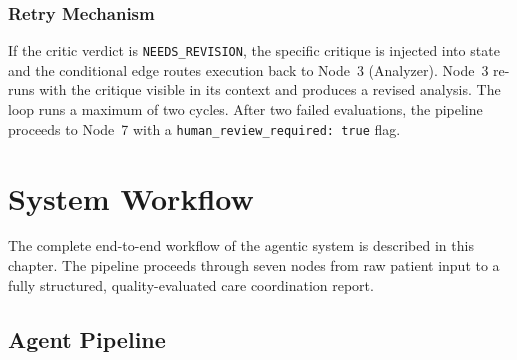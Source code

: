 \documentclass[12pt, a4paper]{report}
\begin{document}
\subsection{Retry Mechanism}

If the critic verdict is \texttt{NEEDS\_REVISION}, the specific critique is injected into state and the conditional edge routes execution back to Node~3 (Analyzer). Node~3 re-runs with the critique visible in its context and produces a revised analysis. The loop runs a maximum of two cycles. After two failed evaluations, the pipeline proceeds to Node~7 with a \texttt{human\_review\_required: true} flag.

\chapter{System Workflow}

The complete end-to-end workflow of the agentic system is described in this chapter. The pipeline proceeds through seven nodes from raw patient input to a fully structured, quality-evaluated care coordination report.

\vspace{0.3cm}

\section{Agent Pipeline}
\end{document}
